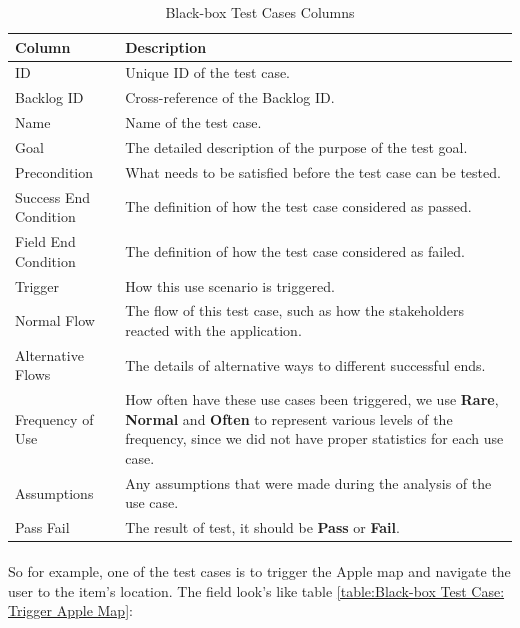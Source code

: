 \documentclass[12pt,a4paper]{article}
\begin{document}
          \begin{table}[H]
            \centering
              \begin{tabularx}{\textwidth}{l X}
                \hline
                Column & Description  \\ \hline
                ID & Unique ID of the test case. \\ 
                Backlog ID & Cross-reference of the Backlog ID. \\ 
                Name & Name of the test case.  \\ 
                Goal & The detailed description of the purpose of the test goal. \\ 
                Precondition & What needs to be satisfied before the test case can be tested. \\
                Success End Condition & The definition of how the test case considered as passed. \\
                Field End Condition & The definition of how the test case considered as failed. \\
                Trigger & How this use scenario is triggered. \\
                Normal Flow & The flow of this test case, such as how the stakeholders reacted with the application. \\
                Alternative Flows & The details of alternative ways to different successful ends. \\
                Frequency of Use & How often have these use cases been triggered, we use {\bf Rare}, {\bf Normal} and {\bf Often} to represent various levels of the frequency, since we did not have proper statistics for each use case. \\
                Assumptions & Any assumptions that were made during the analysis of the use case. \\
                Pass Fail & The result of test, it should be {\bf Pass} or {\bf Fail}. \\
                \hline
              \end{tabularx}
              \caption[Table caption text]{Black-box Test Cases Columns}
              \label{table:Black-box Test Cases Columns}
          \end{table}

          \paragraph{} So for example, one of the test cases is to trigger the Apple map and navigate the user to the item's location. The field look's like table \ref{table:Black-box Test Case: Trigger Apple Map}:
\end{document}
